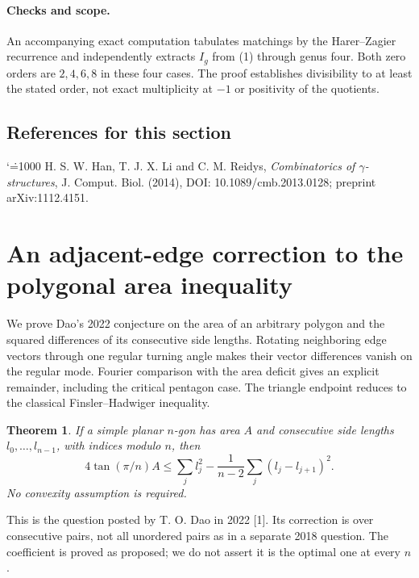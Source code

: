 \documentclass[11pt,a4paper]{article}
\makeatletter
\numberwithin{equation}{section}
\newtheorem{theorem}{Theorem}[section]
\theoremstyle{definition}
\theoremstyle{remark}
\newenvironment{sectionabstract}{\par\smallskip\begingroup\small\noindent}{\par\endgroup\medskip}
\renewenvironment{thebibliography}[1]
 {\subsection*{References for this section}\small
  \list{\@biblabel{\@arabic\c@enumiv}}
       {\settowidth\labelwidth{\@biblabel{#1}}\leftmargin\labelwidth
        \advance\leftmargin\labelsep\@openbib@code
        \usecounter{enumiv}\let\p@enumiv\@empty
        \renewcommand\theenumiv{\@arabic\c@enumiv}}
  \sloppy\clubpenalty4000\widowpenalty4000\sfcode`\.=1000\relax}
 {\def\@noitemerr{\@latex@warning{Empty bibliography}}\endlist}
\makeatother
\begin{document}
\paragraph{Checks and scope.}
An accompanying exact computation tabulates matchings by the
Harer--Zagier recurrence and independently extracts $I_g$ from (1)
through genus four. Both zero orders are $2,4,6,8$ in these four cases.
The proof establishes divisibility to at least the stated order, not
exact multiplicity at $-1$ or positivity of the quotients.
\begin{thebibliography}{9}
 H. S. W. Han, T. J. X. Li and C. M. Reidys,
\emph{Combinatorics of $\gamma$-structures}, J. Comput. Biol. (2014),
DOI: 10.1089/cmb.2013.0128; preprint arXiv:1112.4151.
\end{thebibliography}

\par\endgroup

\begingroup

\section{\texorpdfstring{An adjacent-edge correction to the polygonal area inequality}{An adjacent-edge correction to the polygonal area inequality}}\label{section:r45showa}
\par\medskip


\begin{sectionabstract}
We prove Dao's 2022 conjecture on the area of an arbitrary polygon and the squared differences of its consecutive side lengths. Rotating neighboring edge vectors through one regular turning angle makes their vector differences vanish on the regular mode. Fourier comparison with the area deficit gives an explicit remainder, including the critical pentagon case. The triangle endpoint reduces to the classical Finsler--Hadwiger inequality.
\end{sectionabstract}
\begin{theorem}
If a simple planar $n$-gon has area $A$ and consecutive side lengths $l_0,\ldots,l_{n-1}$, with indices modulo $n$, then
\[
 4\tan(\pi/n)A\le \sum_j l_j^2-\frac{1}{n-2}\sum_j(l_j-l_{j+1})^2 .
\]
No convexity assumption is required.
\end{theorem}
This is the question posted by T. O. Dao in 2022 [1]. Its correction is over consecutive pairs, not all unordered pairs as in a separate 2018 question. The coefficient is proved as proposed; we do not assert it is the optimal one at every $n$.
\end{document}
